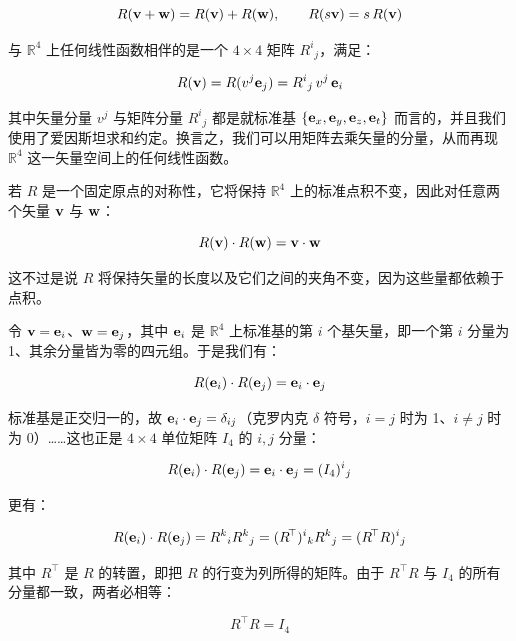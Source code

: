 \begin{equation}
R(\mathbf{v}+\mathbf{w}) = R(\mathbf{v}) + R(\mathbf{w}), \qquad R(s\mathbf{v}) = s\,R(\mathbf{v})
\end{equation}

与 $\mathbb{R}^{4}$ 上任何线性函数相伴的是一个 $4\times4$ 矩阵 $R^{i}{}_{j}$，满足：

\begin{equation}
R(\mathbf{v}) = R(v^{j}\mathbf{e}_{j}) = R^{i}{}_{j}\,v^{j}\,\mathbf{e}_{i}
\end{equation}

其中矢量分量 $v^{j}$ 与矩阵分量 $R^{i}{}_{j}$ 都是就标准基 $\{\mathbf{e}_{x},\mathbf{e}_{y},\mathbf{e}_{z},\mathbf{e}_{t}\}$ 而言的，并且我们使用了爱因斯坦求和约定。换言之，我们可以用矩阵去乘矢量的分量，从而再现 $\mathbb{R}^{4}$ 这一矢量空间上的任何线性函数。

若 $R$ 是一个固定原点的对称性，它将保持 $\mathbb{R}^{4}$ 上的标准点积不变，因此对任意两个矢量 $\mathbf{v}$ 与 $\mathbf{w}$：

\begin{equation}
R(\mathbf{v})\cdot R(\mathbf{w}) = \mathbf{v}\cdot\mathbf{w}
\end{equation}

这不过是说 $R$ 将保持矢量的长度以及它们之间的夹角不变，因为这些量都依赖于点积。

令 $\mathbf{v}=\mathbf{e}_{i}$、$\mathbf{w}=\mathbf{e}_{j}$，其中 $\mathbf{e}_{i}$ 是 $\mathbb{R}^{4}$ 上标准基的第 $i$ 个基矢量，即一个第 $i$ 分量为 1、其余分量皆为零的四元组。于是我们有：

\begin{equation}
R(\mathbf{e}_{i})\cdot R(\mathbf{e}_{j}) = \mathbf{e}_{i}\cdot\mathbf{e}_{j}
\end{equation}

标准基是正交归一的，故 $\mathbf{e}_{i}\cdot\mathbf{e}_{j}=\delta_{ij}$（克罗内克 $\delta$ 符号，$i=j$ 时为 1、$i\neq j$ 时为 0）……这也正是 $4\times4$ 单位矩阵 $I_{4}$ 的 $i,j$ 分量：

\begin{equation}
R(\mathbf{e}_{i})\cdot R(\mathbf{e}_{j}) = \mathbf{e}_{i}\cdot\mathbf{e}_{j} = (I_{4})^{i}{}_{j}
\end{equation}

更有：

\begin{equation}
R(\mathbf{e}_{i})\cdot R(\mathbf{e}_{j}) = R^{k}{}_{i}R^{k}{}_{j} = (R^{\!\top})^{i}{}_{k}R^{k}{}_{j} = (R^{\!\top}R)^{i}{}_{j}
\end{equation}

其中 $R^{\!\top}$ 是 $R$ 的转置，即把 $R$ 的行变为列所得的矩阵。由于 $R^{\!\top}R$ 与 $I_{4}$ 的所有分量都一致，两者必相等：

\begin{equation}
R^{\!\top}R = I_{4}
\end{equation}

